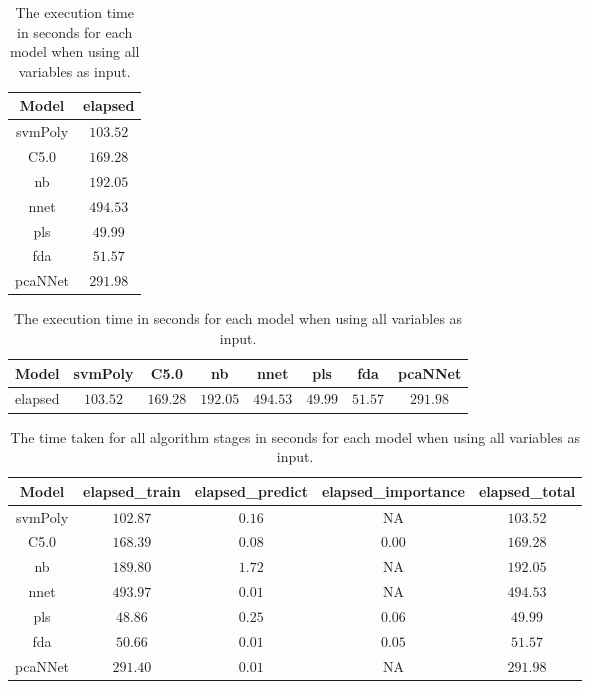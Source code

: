 \begin{table}[!ht]
	\centering
	\begin{tabular}{|c|c|}
		\hline
		Model & elapsed \\ \hline
		svmPoly & $103.52$ \\ \hline
		C5.0 & $169.28$ \\ \hline
		nb & $192.05$ \\ \hline
		nnet & $494.53$ \\ \hline
		pls & $49.99$ \\ \hline
		fda & $51.57$ \\ \hline
		pcaNNet & $291.98$ \\ \hline
	\end{tabular}
	\caption{The execution time in seconds for each model when using all variables as input.}
	\label{tab:time:all:total}
\end{table}

\begin{table}[!ht]
	\centering
	\begin{tabular}{|c|c|c|c|c|c|c|c|}
		\hline
		Model & svmPoly & C5.0 & nb & nnet & pls & fda & pcaNNet \\ \hline
		elapsed & $103.52$ & $169.28$ & $192.05$ & $494.53$ & $49.99$ & $51.57$ & $291.98$ \\ \hline
	\end{tabular}
	\caption{The execution time in seconds for each model when using all variables as input.}
	\label{tab:time:reverse:all:total}
\end{table}

\begin{table}[!ht]
	\centering
	\begin{tabular}{|c|c|c|c|c|}
		\hline
		Model & elapsed_train & elapsed_predict & elapsed_importance & elapsed_total \\ \hline
		svmPoly & $102.87$ & $0.16$ & NA & $103.52$ \\ \hline
		C5.0 & $168.39$ & $0.08$ & $0.00$ & $169.28$ \\ \hline
		nb & $189.80$ & $1.72$ & NA & $192.05$ \\ \hline
		nnet & $493.97$ & $0.01$ & NA & $494.53$ \\ \hline
		pls & $48.86$ & $0.25$ & $0.06$ & $49.99$ \\ \hline
		fda & $50.66$ & $0.01$ & $0.05$ & $51.57$ \\ \hline
		pcaNNet & $291.40$ & $0.01$ & NA & $291.98$ \\ \hline
	\end{tabular}
	\caption{The time taken for all algorithm stages in seconds for each model when using all variables as input.}
	\label{tab:time:all}
\end{table}

